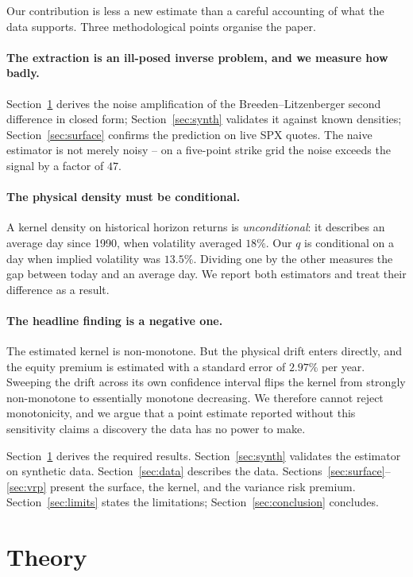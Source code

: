 \documentclass[11pt,a4paper]{article}
\theoremstyle{remark}
\begin{document}
Our contribution is less a new estimate than a careful accounting of what the
data supports. Three methodological points organise the paper.

\paragraph{The extraction is an ill-posed inverse problem, and we measure how
badly.} Section~\ref{sec:theory} derives the noise amplification of the
Breeden--Litzenberger second difference in closed form; Section~\ref{sec:synth}
validates it against known densities; Section~\ref{sec:surface} confirms the
prediction on live SPX quotes. The naive estimator is not merely noisy -- on a
five-point strike grid the noise exceeds the signal by a factor of $47$.

\paragraph{The physical density must be conditional.} A kernel density on
historical horizon returns is \emph{unconditional}: it describes an average day
since 1990, when volatility averaged $18\%$. Our $q$ is conditional on a day
when implied volatility was $13.5\%$. Dividing one by the other measures the
gap between today and an average day. We report both estimators and treat their
difference as a result.

\paragraph{The headline finding is a negative one.} The estimated kernel is
non-monotone. But the physical drift enters directly, and the equity premium is
estimated with a standard error of $2.97\%$ per year. Sweeping the drift across
its own confidence interval flips the kernel from strongly non-monotone to
essentially monotone decreasing. We therefore cannot reject monotonicity, and
we argue that a point estimate reported without this sensitivity claims a
discovery the data has no power to make.

Section~\ref{sec:theory} derives the required results. Section~\ref{sec:synth}
validates the estimator on synthetic data. Section~\ref{sec:data} describes the
data. Sections~\ref{sec:surface}--\ref{sec:vrp} present the surface, the
kernel, and the variance risk premium. Section~\ref{sec:limits} states the
limitations; Section~\ref{sec:conclusion} concludes.

\section{Theory}
\label{sec:theory}
\end{document}
